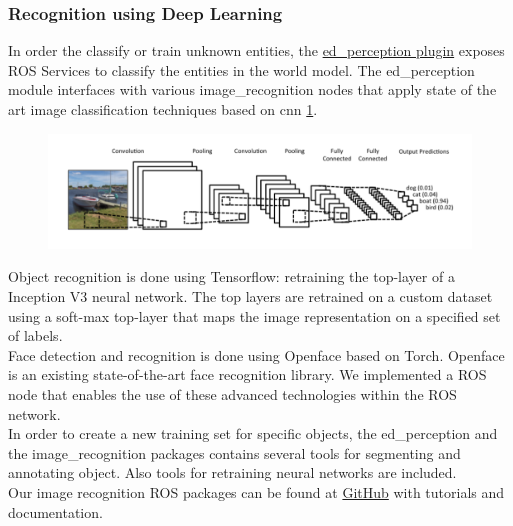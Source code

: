 \subsubsection{Recognition using Deep Learning}
In order the classify or train unknown entities, the \href{https://github.com/tue-robotics/ed_perception}{ed\_perception plugin} exposes ROS Services to classify the entities in the world model. The ed\_perception module interfaces with various image\_recognition nodes that apply state of the art image classification techniques based on \acrfull{cnn} \ref{fig:cnn}.
\begin{figure}[h]
    \centering
    \vspace{-0.3cm}
	\includegraphics[width = 0.9\linewidth]{Figures/cnn}
    \vspace{-1em}
    \caption{}
	\label{fig:cnn}
    \vspace{-0.5cm}
\end{figure}
Object recognition is done using Tensorflow: retraining the top-layer of a Inception V3 neural network. The top layers are retrained on a custom dataset using a soft-max top-layer that maps the image representation on a specified set of labels.
\\
Face detection and recognition is done using Openface based on Torch. Openface is an existing state-of-the-art face recognition library. We implemented a ROS node that enables the use of these advanced technologies within the ROS network.
\\
In order to create a new training set for specific objects, the ed\_perception and the image\_recognition packages contains several tools for segmenting and annotating object. Also tools for retraining neural networks are included.
\\
Our image recognition ROS packages can be found at \href{https://github.com/tue-robotics/image_recognition}{GitHub} with tutorials and documentation. 